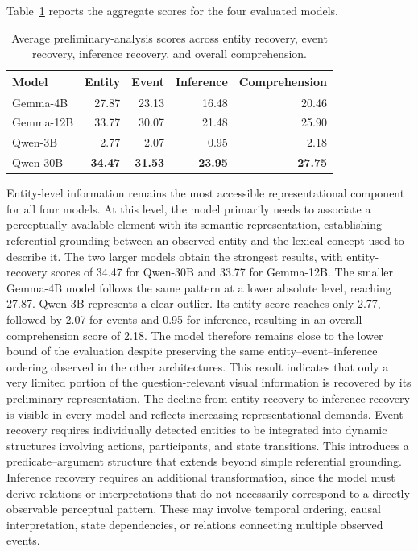 Table~\ref{tab:preliminar_global_scores} reports the aggregate scores for the four evaluated models.

\begin{table}[h]
    \centering
    \small
    \begin{tabular}{lrrrr}
        \hline
        \textbf{Model} &
        \textbf{Entity} &
        \textbf{Event} &
        \textbf{Inference} &
        \textbf{Comprehension} \\
        \hline
        Gemma-4B    &
        27.87 &
        23.13 &
        16.48 &
        20.46 \\
        
        Gemma-12B &
        33.77 &
        30.07 &
        21.48 &
        25.90 \\
        
        Qwen-3B  &
        2.77 &
        2.07 &
        0.95 &
        2.18 \\
        
        Qwen-30B &
        \textbf{34.47} &
        \textbf{31.53} &
        \textbf{23.95} &
        \textbf{27.75} \\
        \hline
    \end{tabular}
    \caption{Average preliminary-analysis scores across entity recovery, event recovery, inference recovery, and overall comprehension.}
    \label{tab:preliminar_global_scores}
\end{table}
Entity-level information remains the most accessible representational component for all four models. At this level, the model primarily needs to associate a perceptually available element with its semantic representation, establishing referential grounding between an observed entity and the lexical concept used to describe it. The two larger models obtain the strongest results, with entity-recovery scores of 34.47 for Qwen-30B and 33.77 for Gemma-12B. The smaller Gemma-4B    model follows the same pattern at a lower absolute level, reaching 27.87.
Qwen-3B  represents a clear outlier. Its entity score reaches only 2.77, followed by 2.07 for events and 0.95 for inference, resulting in an overall comprehension score of 2.18. The model therefore remains close to the lower bound of the evaluation despite preserving the same entity--event--inference ordering observed in the other architectures. This result indicates that only a very limited portion of the question-relevant visual information is recovered by its preliminary representation.
The decline from entity recovery to inference recovery is visible in every model and reflects increasing representational demands. Event recovery requires individually detected entities to be integrated into dynamic structures involving actions, participants, and state transitions. This introduces a predicate--argument structure that extends beyond simple referential grounding. Inference recovery requires an additional transformation, since the model must derive relations or interpretations that do not necessarily correspond to a directly observable perceptual pattern. These may involve temporal ordering, causal interpretation, state dependencies, or relations connecting multiple observed events.
